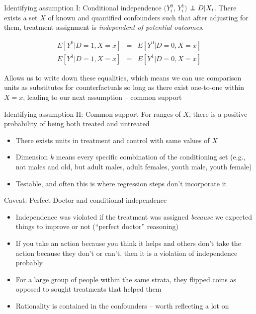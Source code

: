 \documentclass{beamer}
\newcommand\independent{\protect\mathpalette{\protect\independenT}{\perp}}
\def\independenT#1#2{\mathrel{\rlap{$#1#2$}\mkern2mu{#1#2}}}
\begin{document}
\begin{frame}[plain]

	\begin{block}{Identifying assumption I: Conditional independence}
	$(Y_i^0$, $Y_i^1)$ $\independent{D} | X_i$. There exists a set $X$ of known and quantified confounders such that after adjusting for them, treatment assignment is \emph{independent of potential outcomes}.
	\end{block}
	
	\begin{eqnarray*}
	E[Y^0 | D=1, X=x] &=& E[Y^0 | D=0, X=x] \\
	E[Y^1 | D=1, X=x] &=& E[Y^1 | D=0, X=x] 
	\end{eqnarray*}
	
	Allows us to write down these equalities, which means we can use comparison units as substitutes for counterfactuals so long as there exist one-to-one within $X=x$, leading to our next assumption -- common support
	
\end{frame}



\begin{frame}[plain]

	\begin{block}{Identifying assumption II: Common support}
	For ranges of $X$, there is a positive probability of being both treated and untreated
	\end{block}
	
	\begin{itemize}
	\item There exists units in treatment and control with same values of $X$
	\item Dimension $k$ means every specific combination of the conditioning set (e.g., not males and old, but adult males, adult females, youth male, youth female)
	\item Testable, and often this is where regression steps don't incorporate it
	\end{itemize}
	
	
\end{frame}



\begin{frame}{Caveat: Perfect Doctor and conditional independence}

\begin{itemize}
\item Independence was violated if the treatment was assigned \emph{because} we expected things to improve or not (``perfect doctor'' reasoning)
\item If you take an action because you think it helps and others don't take the action because they don't or can't, then it is a violation of independence probably
\item For a large group of people within the same strata, they flipped coins as opposed to sought treatments that helped them
\item Rationality is contained in the confounders -- worth reflecting a lot on
\end{itemize}

\end{frame}
\end{document}
